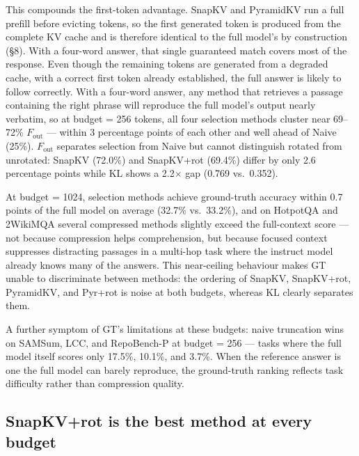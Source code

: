 \documentclass[10pt,letterpaper]{article}
\begin{document}
This compounds the first-token advantage.
SnapKV and PyramidKV run a full prefill before evicting tokens, so the
first generated token is produced from the complete KV cache and is
therefore identical to the full model's by construction (§8). With a
four-word answer, that single guaranteed match covers most of the
response.  Even though the remaining tokens are generated from a degraded cache,
with a correct first token already established, the full answer is
likely to follow correctly.  With a four-word answer, any method that retrieves a
passage containing the right phrase will reproduce the full model's
output nearly verbatim, so at budget = 256 tokens, all four selection methods cluster near
69--72\% \(F_{\text{out}}\) --- within 3 percentage points of each other and well ahead
of Naive (25\%). \(F_{\text{out}}\) separates selection from Naive but cannot
distinguish rotated from unrotated: SnapKV (72.0\%) and SnapKV+rot (69.4\%) differ
by only 2.6 percentage points while KL shows a 2.2$\times$ gap (0.769 vs.\ 0.352).


At budget = 1024, selection methods achieve ground-truth
accuracy within 0.7 points of the full model on average (32.7\%
vs.\ 33.2\%), and on HotpotQA and 2WikiMQA several compressed methods
slightly exceed the full-context score --- not because compression helps
comprehension, but because focused context suppresses distracting
passages in a multi-hop task where the instruct model already knows many
of the answers. This near-ceiling behaviour makes GT unable to
discriminate between methods: the ordering of SnapKV, SnapKV+rot,
PyramidKV, and Pyr+rot is noise at both budgets, whereas KL clearly
separates them.

A further symptom of GT's limitations at these budgets: naive truncation
wins on SAMSum, LCC, and RepoBench-P at budget = 256 --- tasks where
the full model itself scores only 17.5\%, 10.1\%, and 3.7\%. When the
reference answer is one the full model can barely reproduce, the
ground-truth ranking reflects task difficulty rather than compression
quality.

\subsection*{SnapKV+rot is the best method at every budget}
\end{document}
